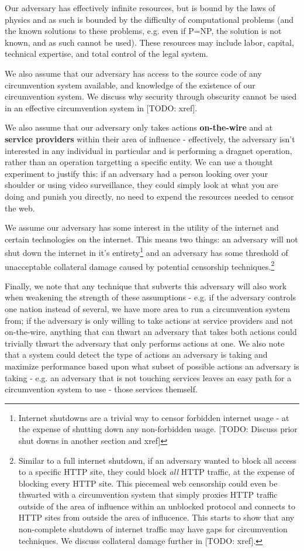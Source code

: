 \documentclass[12pt]{report}
\begin{document}
Our adversary has effectively infinite resources, but is bound by the laws of physics and as such is bounded by the difficulty of computational problems (and the known solutions to these problems, e.g. even if P=NP, the solution is not known, and as such cannot be used). These resources may include labor, capital, technical expertise, and total control of the legal system.

We also assume that our adversary has access to the source code of any circumvention system available, and knowledge of the existence of our circumvention system. We discuss why security through obscurity cannot be used in an effective circumvention system in [TODO: xref].

We also assume that our adversary only takes actions \textbf{on-the-wire} and at \textbf{service providers} within their area of influence - effectively, the adversary isn't interested in any individual in particular and is performing a dragnet operation, rather than an operation targetting a specific entity. We can use a thought experiment to justify this: if an adversary had a person looking over your shoulder or using video surveillance, they could simply look at what you are doing and punish you directly, no need to expend the resources needed to censor the web.

We assume our adversary has some interest in the utility of the internet and certain technologies on the internet. This means two things: an adversary will not shut down the internet in it's entirety\footnote{Internet shutdowns are a trivial way to censor forbidden internet usage - at the expense of shutting down any non-forbidden usage. [TODO: Discuss prior shut downs in another section and xref]} and an adversary has some threshold of unacceptable collateral damage caused by potential censorship techniques.\footnote{Similar to a full internet shutdown, if an adversary wanted to block all access to a specific HTTP site, they could block \emph{all} HTTP traffic, at the expense of blocking every HTTP site. This piecemeal web censorship could even be thwarted with a circumvention system that simply proxies HTTP traffic outside of the area of influence within an unblocked protocol and connects to HTTP sites from outside the area of influcence. This starts to show that any non-complete shutdown of internet traffic may have gaps for circumvention techniques. We discuss collateral damage further in [TODO: xref].}

Finally, we note that any technique that subverts this adversary will also work when weakening the strength of these assumptions - e.g. if the adversary controls one nation instead of several, we have more area to run a circumvention system from; if the adversary is only willing to take actions at service providers and not on-the-wire, anything that can thwart an adversary that takes both actions could trivially thwart the adversary that only performs actions at one. We also note that a system could detect the type of actions an adversary is taking and maximize performance based upon what subset of possible actions an adversary is taking - e.g. an adversary that is not touching services leaves an easy path for a circumvention system to use - those services themself.
\end{document}
